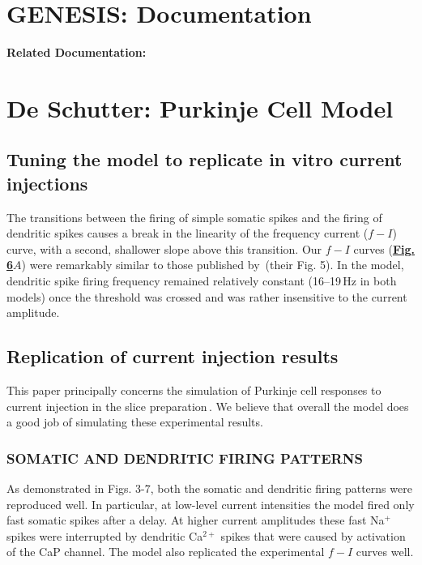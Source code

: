 \documentclass[12pt]{article}
\begin{document}
\section*{GENESIS: Documentation}

{\bf Related Documentation:}

\section*{De Schutter: Purkinje Cell Model}

\subsection*{Tuning the model to replicate in vitro current injections}

The transitions between the firing of simple somatic spikes and the firing of dendritic spikes causes a break in the linearity of the frequency current ($f-I$) curve, with a second, shallower slope above this transition. Our $f-I$ curves (\href{../pub-purkinje-deschutter1-fig-6/pub-purkinje-deschutter1-fig-6.tex}{\bf Fig. 6$A$}) were remarkably similar to those published by\,\cite{R:1980ly} (their Fig. 5). In the model, dendritic spike firing frequency remained relatively constant (16--19\,Hz in both models) once the threshold was crossed and was rather insensitive to the current amplitude.

\subsection*{Replication of current injection results}

This paper principally concerns the simulation of Purkinje cell responses to current injection in the slice preparation\,\cite{Hounsgaard:1988nx, R:1980ly, R:1980pi, Llinas:1992rq}. We believe that overall the model does a good job of simulating these experimental results.

\subsubsection*{SOMATIC AND DENDRITIC FIRING PATTERNS}

As demonstrated in Figs. 3-7, both the somatic and dendritic firing patterns were reproduced well. In particular, at low-level current intensities the model fired only fast somatic spikes
after a delay. At higher current amplitudes these fast Na$^+$
spikes were interrupted by dendritic Ca$^{2+}$ spikes that were
caused by activation of the CaP channel. The model also
replicated the experimental $f-I$ curves well.
\end{document}
